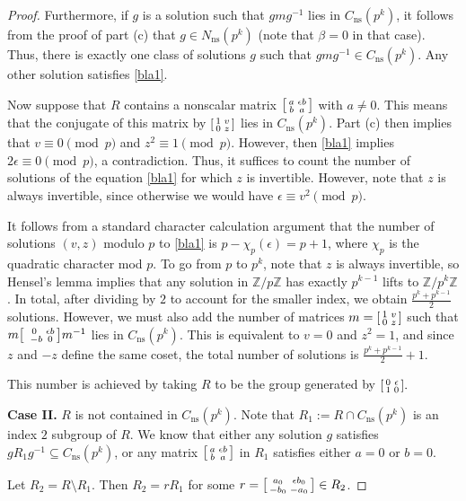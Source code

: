 \documentclass[10pt,a4paper]{amsart}
\newcommand{\Z}{\mathbb{Z}}
\newcommand\sm[1]{\begin{bsmallmatrix}#1\end{bsmallmatrix}}
\begin{document}
\begin{proof}
Furthermore, if $g$ is a solution such that $gmg^{-1}$ lies in $C_{\mathrm{ns}}(p^k)$, it follows from the proof of part (c) that $g\in N_{\mathrm{ns}}(p^k)$ (note that $\beta=0$ in that case). Thus, there is exactly one class of solutions $g$ such that $gmg^{-1} \in C_{\mathrm{ns}}(p^k)$. Any other solution satisfies \eqref{bla1}.

Now suppose that $R$ contains a nonscalar matrix $\sm{a & \epsilon b \\b & a}$ with $a\neq 0$. This means that the conjugate of this matrix by $\sm{1 & v \\ 0 & z}$ lies in $C_{\mathrm{ns}}(p^k)$. Part (c) then implies that $v\equiv 0 \pmod p$ and $z^2\equiv 1 \pmod p$. However, then \eqref{bla1} implies $2\epsilon \equiv 0 \pmod p$, a contradiction. Thus, it suffices to count the number of solutions of the equation \eqref{bla1} for which $z$ is invertible. However, note that $z$ is always invertible, since otherwise we would have $\epsilon \equiv v^2 \pmod p$.

It follows from a standard character calculation argument that the number of solutions $(v,z)$ modulo $p$ to  \eqref{bla1} is $p-\chi_p(\epsilon)=p+1$, where $\chi_p$ is the quadratic character mod $p$. To go from $p$ to $p^k$, note that $z$ is always invertible, so Hensel's lemma implies that any solution in $\Z/p\Z$ has exactly $p^{k-1}$ lifts to $\Z/p^k\Z$. In total, after dividing by $2$ to account for the smaller index, we obtain $\frac{p^k+p^{k-1}}{2}$ solutions. However, we must also add the number of matrices $m=\sm{1 & v \\ 0 & z}$ such that $m\sm{0 & \epsilon b \\\ -b & 0}m^{-1}$ lies in $C_{\mathrm{ns}}(p^k)$. This is equivalent to $v=0$ and $z^2=1$, and since $z$ and $-z$ define the same coset, the total number of solutions is $\frac{p^k+p^{k-1}}{2}+1$.

This number is achieved by taking $R$ to be the group generated by $\sm{0 & \epsilon  \\ 1 & 0}.$

\noindent \textbf{Case II.} $R$ is not contained in $C_{\mathrm{ns}}(p^k)$. Note that $R_1:=R\cap C_{\mathrm{ns}}(p^k)$ is an index $2$ subgroup of $R$. We know that either any solution $g$ satisfies $gR_1g^{-1}\subseteq C_{\mathrm{ns}}(p^k)$, or any matrix $\sm{a & \epsilon b \\b & a}$ in $R_1$ satisfies either $a=0$ or $b=0$. 

Let $R_2=R\setminus R_1$. Then $R_2=rR_1$ for some $r=\sm{a_0 & \epsilon b_0 \\ -b_0 & -a_0}\in R_2$.  


\end{proof}
\end{document}
